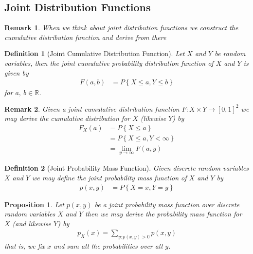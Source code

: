 \documentclass[11pt, oneside]{book}   	%
\newtheorem{definition}{Definition}[chapter]
\newtheorem{remark}{Remark}[chapter]
\newtheorem{proposition}{Proposition}[chapter]
\newcommand{\set}[1]{\left\{#1\right\}}
\begin{document}
\begin{spacing}{1.618}
\subsection{Joint Distribution Functions}

\begin{remark}
	When we think about joint distribution functions we construct the cumulative distribution function and derive from there
\end{remark}

\begin{definition}[Joint Cumulative Distribution Function]
	Let $X$ and $Y$ be random variables, then the \emph{joint cumulative probability distribution function} of $X$ and $Y$ is given by
	\begin{alignat}{4}
		F(a, b)&=P\set{X\leq a, Y\leq b}
	\end{alignat}
	for $a,~b\in\mathbb{R}$. 
\end{definition}

\begin{remark}
	Given a joint cumulative distribution function $F:X\times Y\to [0,1]^2$ we may derive the cumulative distribution for $X$ (likewise $Y$) by 
	\begin{alignat}{4}
		F_X(a)&=P\set{X\leq a} \\
			&=P\set{X\leq a, Y<\infty} \\
			&=\lim_{y\to\infty}F(a, y)
	\end{alignat}
\end{remark}

\begin{definition}[Joint Probability Mass Function]
	Given discrete random variables $X$ and $Y$ we may define the \emph{joint probability mass function} of $X$ and $Y$ by 
	\begin{alignat}{4}
		p(x, y)&=P\set{X=x, Y=y}
	\end{alignat}
\end{definition}

\begin{proposition}
	Let $p(x, y)$ be a joint probability mass function over discrete random variables $X$ and $Y$ then we may derive the probability mass function for $X$ (and likewise $Y$) by 
	\begin{alignat}{4}
		p_X(x)=\sum_{y:p(x, y)>0} p(x, y)
	\end{alignat}
	that is, we fix $x$ and sum all the probabilities over all $y$. 
\end{proposition}


\end{spacing}
\end{document}
